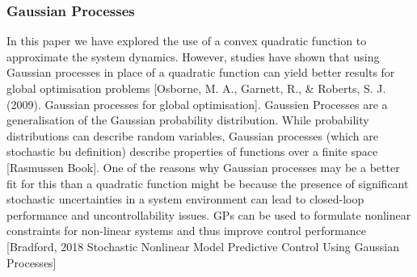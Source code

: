 \documentclass[conference]{IEEEtran}
\theoremstyle{definition}
\begin{document}
\subsubsection{Gaussian Processes}
\noindent In this paper we have explored the use of a convex quadratic function to approximate the system dynamics. However, studies have shown that using Gaussian processes in place of a quadratic function can yield better results for global optimisation problems [Osborne, M. A., Garnett, R., \& Roberts, S. J. (2009). Gaussian processes for global optimisation]. Gaussien Processes are a generalisation of the Gaussian probability distribution. While probability distributions can describe random variables, Gaussian processes (which are stochastic bu definition) describe properties of functions over a finite space [Rasmussen Book]. One of the reasons why Gaussian processes may be a better fit for this than a quadratic function might be because the presence of significant stochastic uncertainties in a system environment can lead to closed-loop performance and uncontrollability issues. GPs can be used to formulate nonlinear constraints for non-linear systems and thus improve control performance [Bradford, 2018  Stochastic Nonlinear Model Predictive Control Using Gaussian Processes]
\end{document}
